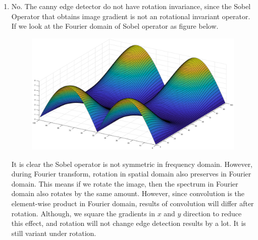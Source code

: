 \documentclass[12pt]{article}
\begin{document}
\begin{enumerate}
\begin{enumerate}
	\item No. The canny edge detector do not have rotation invariance, since the Sobel Operator that obtains image gradient is not an rotational invariant operator. If we look at the Fourier domain of Sobel operator as figure below.
	\begin{figure}[H]
		\centering
		\includegraphics[width=\textwidth]{q4d.eps}
	\end{figure}  
	It is clear the Sobel operator is not symmetric in frequency domain. However, during Fourier transform, rotation in spatial domain also preserves in Fourier domain. This means if we rotate the image, then the spectrum in Fourier domain also rotates by the same amount. However, since convolution is the element-wise product in Fourier domain, results of convolution will differ after rotation. Although, we square the gradients in $x$ and $y$ direction to reduce this effect, and rotation will not change edge detection results by a lot. It is still variant under rotation.\\
	

\end{enumerate}
\end{enumerate}
\end{document}
